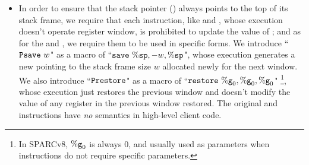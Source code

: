 \begin{itemize}
    \item
    In order to ensure that
    the stack pointer (\spreg{}) always
    points to the top of its stack frame, we require that
    each instruction, like \cadd{} and \ld{}, whose
    execution doesn't operate register window,
    is prohibited to update the value of \spreg{};
    and as for the \csave{} and \crestore{},
    we require them
    to be used in specific forms.
    We introduce ``$\Psave \ \word$" as a macro of
    ``$\csave{} \ \spreg, -\word, \spreg$", whose execution
    generates a new \spreg{} pointing to the stack frame
    size $w$ allocated newly for the next window.
    We also introduce ``$\texttt{Prestore}$"
    as a macro of ``$\texttt{restore}{} \ \%\texttt{g}_{0}, \%\texttt{g}_{0}, \%\texttt{g}_{0}$"
    \footnote{In SPARCv8, $\%\texttt{g}_{0}$ is always 0,
    and usually used as parameters when instructions do not
    require specific parameters.},
    whose execution just restores the previous window
    and doesn't modify the value of any register
    in the previous window restored.
    The original \csave{} and \crestore{} instructions
    have \textit{no} semantics in high-level client code.


\end{itemize}
